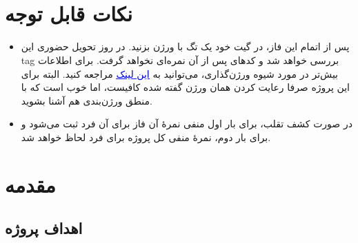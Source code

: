 \documentclass[]{article}
\begin{document}
\newpage
\pagestyle{fancy}
\fancyhf{}
\fancyfoot{}
\cfoot{\thepage}
\renewcommand{\headrulewidth}{2pt}

\KashidaOff



\tableofcontents

\newpage

 \Large \textbf{\\\\
}


\section*{{\titr نکات قابل توجه}}
\begin{itemize}
\item
پس از اتمام این فاز، در گیت خود یک تگ با ورژن  بزنید. در روز تحویل حضوری این tag بررسی خواهد شد و کدهای پس از آن نمره‌ای نخواهد گرفت. برای اطلاعات بیش‌تر در مورد شیوه ورژن‌گذاری، می‌توانید به
 \href{https://semver.org/}{\textcolor{blue}{\underline{این لینک}}}
 مراجعه کنید. البته برای این پروژه صرفا رعایت کردن همان ورژن گفته شده کافیست، اما خوب‌ است که با منطق ورژن‌بندی هم آشنا بشوید.

\item
در صورت کشف تقلب، برای بار اول منفی نمرهٔ آن فاز برای آن فرد ثبت می‌شود و برای بار دوم، نمرهٔ منفی کل پروژه برای فرد لحاظ خواهد‌ شد.

\end{itemize}

\newpage

\section*{{\titr مقدمه}}

\subsection*{{\titr اهداف پروژه}}

\end{document}
